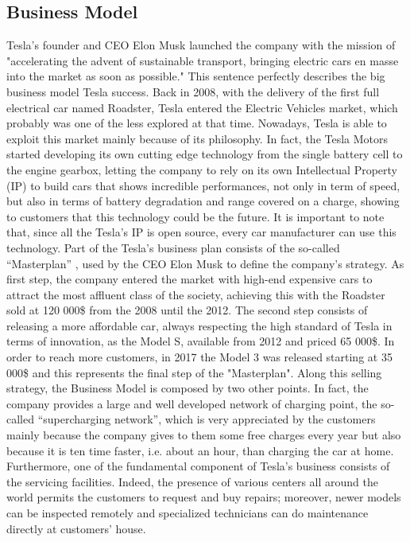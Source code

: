 \subsection{Business Model}
Tesla's founder and CEO Elon Musk launched the company with the mission of "accelerating the advent of sustainable transport, bringing electric cars en masse into the market as soon as possible." This sentence perfectly describes the big business model Tesla success.
Back in 2008, with the delivery of the first full electrical car named Roadster, Tesla entered the Electric Vehicles market, which probably was one of the less explored at that time.  
Nowadays, Tesla is able to exploit this market mainly because of its philosophy. In fact, the Tesla Motors started developing its own cutting edge technology from the single battery cell to the engine gearbox, letting the company to rely on its own Intellectual Property (IP) to build cars that shows incredible performances, not only in term of speed, but also in terms of battery degradation and range covered on a charge, showing to customers that this technology could be the future. 
It is important to note that, since all the Tesla’s IP is open source, every car manufacturer can use this technology.
Part of the Tesla’s business plan consists of the so-called “Masterplan” \cite{TeslaMasterplan}, used by the CEO Elon Musk to define the company’s strategy. As first step, the company entered the market with high-end expensive cars to attract the most affluent class of the society, achieving this with the Roadster sold at 120 000\$ from the 2008 until the 2012. The second step consists of releasing a more affordable car, always respecting the high standard of Tesla in terms of innovation, as the Model S, available from 2012 and priced 65 000\$. In order to reach more customers, in 2017 the Model 3 was released starting at 35 000\$ and this represents the final step of the "Masterplan".
Along this selling strategy, the Business Model is composed by two other points.
In fact, the company provides a large and well developed network of charging point, the so-called “supercharging network”, which is very appreciated by the customers mainly because the company gives to them some free charges every year but also because it is ten time faster, i.e. about an hour, than charging the car at home.
Furthermore, one of the fundamental component of Tesla's business consists of the servicing facilities. Indeed, the presence of various centers all around the world permits the customers to request and buy repairs; moreover, newer models can be inspected remotely and specialized technicians can do maintenance directly at customers' house.
